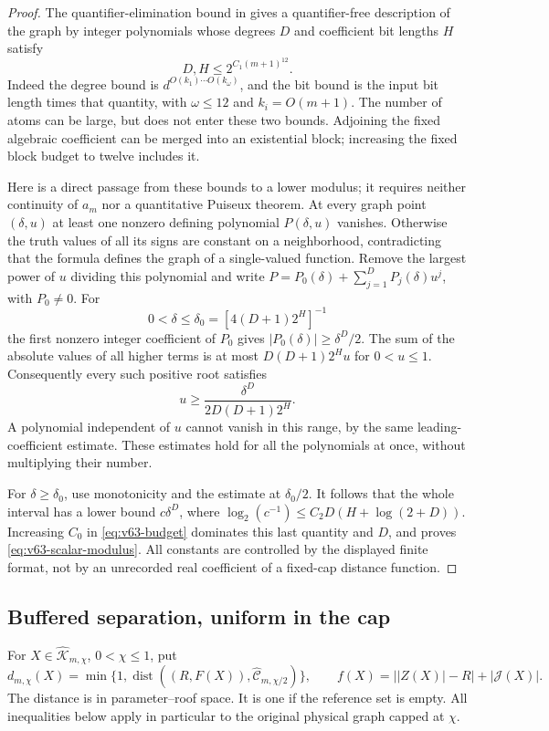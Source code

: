 \begin{proof}
The quantifier-elimination bound in \cite[Theorem 4]{BMN} gives a
quantifier-free description of the graph by integer polynomials whose
degrees $D$ and coefficient bit lengths $H$ satisfy
\[
 D,H\le2^{C_1(m+1)^{12}}.
\]
Indeed the degree bound is $d^{O(k_1)\cdots O(k_\omega)}$, and the
bit bound is the input bit length times that quantity, with
$\omega\le12$ and $k_i=O(m+1)$. The number of atoms can be large,
but does not enter these two bounds. Adjoining the fixed algebraic
coefficient can be merged into an existential block; increasing the
fixed block budget to twelve includes it.

Here is a direct passage from these bounds to a lower modulus; it
requires neither continuity of $a_m$ nor a quantitative Puiseux theorem.
At every graph point $(\delta,u)$ at least one nonzero defining
polynomial $P(\delta,u)$ vanishes. Otherwise the truth values of all
its signs are constant on a neighborhood, contradicting that the
formula defines the graph of a single-valued function. Remove the
largest power of $u$ dividing this polynomial and write
$P=P_0(\delta)+\sum_{j=1}^D P_j(\delta)u^j$, with $P_0\ne0$.
For
\[
 0<\delta\le\delta_0=[4(D+1)2^H]^{-1}
\]
the first nonzero integer coefficient of $P_0$ gives
$|P_0(\delta)|\ge\delta^D/2$. The sum of the absolute values of
all higher terms is at most $D(D+1)2^H u$ for $0<u\le1$.
Consequently every such positive root satisfies
\[
 u\ge\frac{\delta^D}{2D(D+1)2^H}.
\]
A polynomial independent of $u$ cannot vanish in this range, by the
same leading-coefficient estimate. These estimates hold for all the
polynomials at once, without multiplying their number.

For $\delta\ge\delta_0$, use monotonicity and the estimate at
$\delta_0/2$. It follows that the whole interval has a lower bound
$c\delta^D$, where $\log_2(c^{-1})\le C_2D(H+\log(2+D))$.
Increasing $C_0$ in \eqref{eq:v63-budget} dominates this last quantity
and $D$, and proves \eqref{eq:v63-scalar-modulus}. All constants are
controlled by the displayed finite format, not by an unrecorded
real coefficient of a fixed-cap distance function.
\end{proof}

\subsection{Buffered separation, uniform in the cap}
For $X\in\widehat{\mathcal K}_{m,\chi}$, $0<\chi\le1$, put
\begin{equation}\label{eq:v63-buffered-distance}
 d_{m,\chi}(X)=\min\{1,\operatorname{dist}((R,F(X)),
                                      \widehat{\mathcal C}_{m,\chi/2})\},
 \qquad f(X)=\bigl||Z(X)|-R\bigr|+|\mathcal J(X)|.
\end{equation}
The distance is in parameter--roof space. It is one if the reference
set is empty. All inequalities below apply in particular to the
original physical graph capped at $\chi$.

